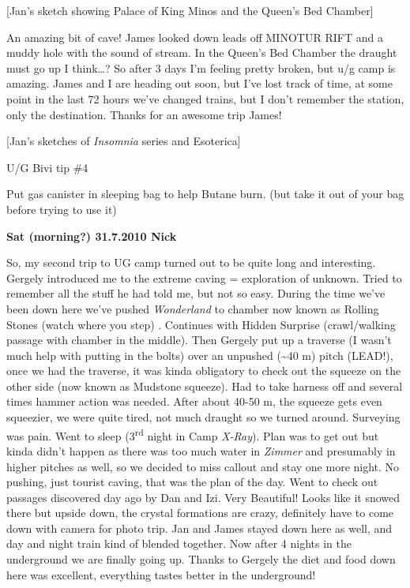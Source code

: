 {[}Jan's sketch showing Palace of King Minos and the Queen's Bed
Chamber{]}

An amazing bit of cave! James looked down leads off MINOTUR RIFT and a
muddy hole with the sound of stream. In the Queen's Bed Chamber the
draught must go up I think\ldots{}? So after 3 days I'm feeling pretty
broken, but u/g camp is amazing. James and I are heading out soon, but
I've lost track of time, at some point in the last 72 hours we've
changed trains, but I don't remember the station, only the destination.
Thanks for an awesome trip James!

{[}Jan's sketches of \emph{Insomnia} series and Esoterica{]}

U/G Bivi tip \#4

Put gas canister in sleeping bag to help Butane burn. (but take it out
of your bag before trying to use it)

\textbf{Sat (morning?) 31.7.2010 Nick}

So, my second trip to UG camp turned out to be quite long and
interesting. Gergely introduced me to the extreme caving = exploration
of unknown. Tried to remember all the stuff he had told me, but not so
easy. During the time we've been down here we've pushed
\emph{Wonderland} to chamber now known as Rolling Stones (watch where
you step) . Continues with Hidden Surprise (crawl/walking passage with
chamber in the middle). Then Gergely put up a traverse (I wasn't much
help with putting in the bolts) over an unpushed (\textasciitilde 40 m)
pitch (LEAD!), once we had the traverse, it was kinda obligatory to
check out the squeeze on the other side (now known as Mudstone squeeze).
Had to take harness off and several times hammer action was needed.
After about 40-50 m, the squeeze gets even squeezier, we were quite
tired, not much draught so we turned around. Surveying was pain. Went to
sleep (3\textsuperscript{rd} night in Camp \emph{X-Ray}). Plan was to
get out but kinda didn't happen as there was too much water in
\emph{Zimmer} and presumably in higher pitches as well, so we decided to
miss callout and stay one more night. No pushing, just tourist caving,
that was the plan of the day. Went to check out passages discovered day
ago by Dan and Izi. Very Beautiful! Looks like it snowed there but
upside down, the crystal formations are crazy, definitely have to come
down with camera for photo trip. Jan and James stayed down here as well,
and day and night train kind of blended together. Now after 4 nights in
the underground we are finally going up. Thanks to Gergely the diet and
food down here was excellent, everything tastes better in the
underground!

